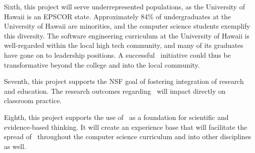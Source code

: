 Sixth, this project will serve underrepresented populations, as the
University of Hawaii is an EPSCOR state. Approximately 84\% of
undergraduates at the University of Hawaii are minorities, and the computer
science students exemplify this diversity.  The software engineering
curriculum at the University of Hawaii is well-regarded within the local
high tech community, and many of its graduates have gone on to leadership
positions. A successful \eCT\ initiative could thus be transformative
beyond the college and into the local community.

Seventh, this project supports the NSF goal of fostering integration of
research and education.  The research outcomes regarding \eCT\ will impact
directly on classroom practice.

Eighth, this project supports the use of \eCT\ as a foundation for
scientific and evidence-based thinking. It will create an experience
base that will facilitate the spread of \eCT\ throughout the computer
science curriculum and into other disciplines as well. 








 










